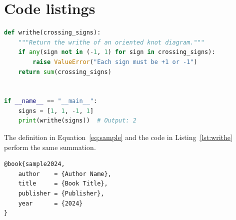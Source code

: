 \documentclass[11pt,a4paper]{article}
\theoremstyle{definition}                   %
\begin{document}
\section{Code listings}
%

\begin{lstlisting}[language=Python,
                   caption={Computing the writhe from signed crossings (23\_A1).},
                   label={lst:writhe}]
def writhe(crossing_signs):
    """Return the writhe of an oriented knot diagram."""
    if any(sign not in (-1, 1) for sign in crossing_signs):
        raise ValueError("Each sign must be +1 or -1")
    return sum(crossing_signs)


if __name__ == "__main__":
    signs = [1, 1, -1, 1]
    print(writhe(signs))  # Output: 2
\end{lstlisting}

The definition in Equation~\eqref{eq:sample} and the code in
Listing~\ref{lst:writhe} perform the same summation.

%
%   
%

\begin{verbatim}
@book{sample2024,
    author    = {Author Name},
    title     = {Book Title},
    publisher = {Publisher},
    year      = {2024}
}
\end{verbatim}
\end{document}
